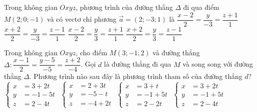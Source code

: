\begin{ex}%
	Trong không gian $Oxyz$,  phương trình của đường thẳng $\Delta$ đi qua điểm $M(2;0;-1)$ và có vectơ chỉ phương $\overrightarrow{a}=(2;-3;1)$ là
	\choice 
		{\True  $\dfrac{x-2}{2}=\dfrac{y}{-3}=\dfrac{z+1}{1}$}
		 {$\dfrac{x+2}{2}=\dfrac{y}{-3}=\dfrac{z-1}{1}$}
		{$\dfrac{x-2}{2}=\dfrac{y}{3}=\dfrac{z+1}{1}$} 
		{$\dfrac{x+2}{2}=\dfrac{y}{3}=\dfrac{z-1}{1}$} 
\end{ex}

\begin{ex}%
	Trong không gian $Oxyz$, cho điểm $M(3;-1;2)$  và đường thẳng $\Delta:\dfrac{x-1}{2}=\dfrac{y-5}{-5}=\dfrac{z+2}{-4}$. Gọi $d$ là đường thẳng đi qua $M$ và song song với đường thẳng $\Delta$. Phương trình nào sau đây là phương trình tham số của đường thẳng $d$?
	 \choice
		{\True $\left\{\begin{aligned}x &= 3+2t \\ y &= -1-5t \\ z &= 2-4t
\end{aligned}\right.$}
{$\left\{\begin{aligned}x &= 2+3t \\ y &= -5-t \\ z &= -4+2t
\end{aligned}\right.$}
{$\left\{\begin{aligned}x &= 3+t \\ y &= -1+5t \\ z &= 2-2t
\end{aligned}\right.$}
{$\left\{\begin{aligned}x &= 3+2t \\ y &= -1+5t \\ z &= 2-4t
\end{aligned}\right.$}
	\end{ex}

